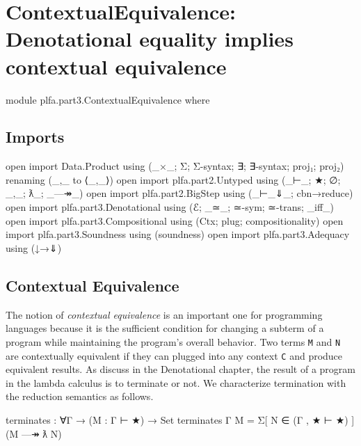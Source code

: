 \hypertarget{ContextualEquivalence}{%
\chapter{ContextualEquivalence: Denotational equality implies contextual
equivalence}\label{ContextualEquivalence}}

\begin{fence}
\begin{code}
module plfa.part3.ContextualEquivalence where
\end{code}
\end{fence}

\hypertarget{imports}{%
\section{Imports}\label{imports}}

\begin{fence}
\begin{code}
open import Data.Product using (_×_; Σ; Σ-syntax; ∃; ∃-syntax; proj₁; proj₂)
     renaming (_,_ to ⟨_,_⟩)
open import plfa.part2.Untyped using (_⊢_; ★; ∅; _,_; ƛ_; _—↠_)
open import plfa.part2.BigStep using (_⊢_⇓_; cbn→reduce)
open import plfa.part3.Denotational using (ℰ; _≃_; ≃-sym; ≃-trans; _iff_)
open import plfa.part3.Compositional using (Ctx; plug; compositionality)
open import plfa.part3.Soundness using (soundness)
open import plfa.part3.Adequacy using (↓→⇓)
\end{code}
\end{fence}

\hypertarget{contextual-equivalence}{%
\section{Contextual Equivalence}\label{contextual-equivalence}}

The notion of \emph{contextual equivalence} is an important one for
programming languages because it is the sufficient condition for
changing a subterm of a program while maintaining the program's overall
behavior. Two terms \texttt{M} and \texttt{N} are contextually
equivalent if they can plugged into any context \texttt{C} and produce
equivalent results. As discuss in the Denotational chapter, the result
of a program in the lambda calculus is to terminate or not. We
characterize termination with the reduction semantics as follows.

\begin{fence}
\begin{code}
terminates : ∀{Γ} → (M : Γ ⊢ ★) → Set
terminates {Γ} M = Σ[ N ∈ (Γ , ★ ⊢ ★) ] (M —↠ ƛ N)
\end{code}
\end{fence}

